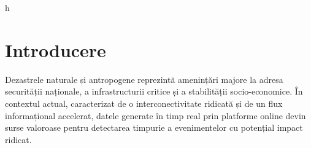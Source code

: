 h\documentclass[12pt,a4paper]{article}
\begin{document}
\newpage
{}
{}
\begin{abstract}
    \noindent
    
    Această lucrare prezintă o abordare inovatoare pentru detecția automată a dezastrelor naturale și antropogene prin analiza surselor online. Cercetarea propune un sistem integrat care utilizează tehnici moderne de procesare a limbajului natural și învățare automată pentru identificarea rapidă a evenimentelor critice din fluxurile de știri și rețelele sociale. Sistemul implementează mecanisme de validare multisursă și geolocalizare, având ca obiectiv final îmbunătățirea timpului de reacție și furnizarea de alerte timpurii în situații de urgență. Rezultatele preliminare indică o acuratețe semnificativă în clasificarea evenimentelor și o reducere substanțială a timpului de detectare comparativ cu metodele tradiționale.
    
    Sistemul menționat va rula ca modul de sine stătător pe o platformă care își propune utilizarea unei arhitecturi de microservicii containerizată bazată, în faza inițială, pe Docker, unde fiecare componentă rulează într-un container izolat care comunică prin intermediul unei rețele Docker dedicate. 
    
    \vspace{0.5cm}
    \noindent\textbf{Cuvinte-cheie:} detecție dezastre, surse online, procesare limbaj natural, învățare automată, sisteme de avertizare timpurie.
\end{abstract}

\newpage
\tableofcontents



\newpage
\section{Introducere}
\label{sec:introducere}

\hspace{1em} Dezastrele naturale și antropogene reprezintă amenințări majore la adresa securității naționale, a infrastructurii critice și a stabilității socio-economice. În contextul actual, caracterizat de o interconectivitate ridicată  și de un flux informațional accelerat, datele generate în timp real prin platforme online devin surse valoroase pentru detectarea timpurie a evenimentelor cu potențial impact ridicat. 
\end{document}
